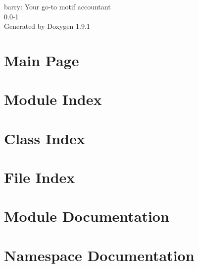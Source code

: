 \let\mypdfximage\pdfximage\def\pdfximage{\immediate\mypdfximage}\documentclass[twoside]{book}
\newcommand{\+}{\discretionary{\mbox{\scriptsize$\hookleftarrow$}}{}{}}
\newcommand{\clearemptydoublepage}{%
  \newpage{\pagestyle{empty}\cleardoublepage}%
}
\begin{document}
\raggedbottom

\hypersetup{pageanchor=false,
             bookmarksnumbered=true,
             pdfencoding=unicode
            }
\begin{titlepage}
\vspace*{7cm}
\begin{center}%
{\Large barry\+: Your go-\/to motif accountant \\[1ex]\large 0.\+0-\/1 }\\
\vspace*{1cm}
{\large Generated by Doxygen 1.9.1}\\
\end{center}
\end{titlepage}
\clearemptydoublepage
{}
\tableofcontents
\clearemptydoublepage
{}
\hypersetup{pageanchor=true}

\chapter{Main Page}
\label{index}\hypertarget{index}{}
\chapter{Module Index}

\chapter{Class Index}

\chapter{File Index}

\chapter{Module Documentation}





\chapter{Namespace Documentation}







\end{document}
